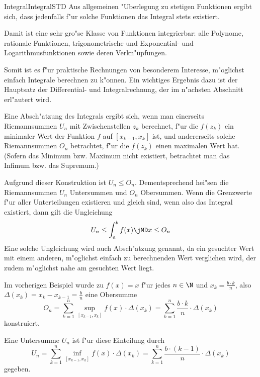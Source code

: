 \begin{MXContent}{Integral}{Integral}{STD}
Aus allgemeinen "Uberlegung zu stetigen Funktionen ergibt sich, dass jedenfalls 
f"ur solche Funktionen das Integral stets existiert.

Damit ist eine sehr gro"se Klasse von Funktionen integrierbar: alle Polynome,
rationale Funktionen, trigonometrische und Exponential- und Logarithmusfunktionen
sowie deren Verkn"upfungen.

Somit ist es f"ur praktische Rechnungen von besonderem Interesse, m"oglichst 
einfach Integrale berechnen zu k"onnen. Ein wichtiges Ergebnis dazu ist der 
Hauptsatz der Differential- und Integralrechnung, der im n"achsten Abschnitt 
erl"autert wird.

Eine Absch"atzung des Integrals ergibt sich, wenn man einerseits Riemannsummen 
$U_n$ mit {\glqq}Zwischenstellen{\grqq} $z_k$ berechnet, f"ur die $f(z_k)$ ein
minimaler Wert der Funktion $f$ auf $[x_{k-1}, x_k]$ ist, und andererseits 
solche Riemannsummen $O_n$ betrachtet, f"ur die $f(z_k)$ einen maximalen Wert 
hat. (Sofern das Minimum bzw. Maximum nicht existiert, betrachtet man das 
Infimum bzw. das Supremum.)

Aufgrund dieser Konstruktion ist $U_n \leq O_n$. 
Dementsprechend hei"sen die Riemannsummen $U_n$ Untersummen und $O_n$ Obersummen. 
Wenn die Grenzwerte f"ur aller Unterteilungen 
existieren und gleich sind, wenn also das Integral existiert, dann gilt die 
Ungleichung
\begin{equation}
U_n \leq \int_a^b f(x) \jMD x \leq O_n
\end{equation}
Eine solche Ungleichung wird auch Absch"atzung genannt, da ein gesuchter Wert 
mit einem anderen, m"oglichst einfach zu berechnenden Wert verglichen wird, 
der zudem m"oglichst {\glqq}nahe{\grqq} am gesuchten Wert liegt.

\begin{MExample}
Im vorherigen Beispiel wurde zu $f(x) = x$ f"ur jedes $n \in \N$ und 
$x_k = \frac{b \cdot k}{n}$, also 
$\Delta(x_k) = x_k - x_{k-1} = \frac{b}{n}$ 
eine Obersumme
\[
O_n = \sum_{k=1}^n \sup_{[x_{k-1}, x_k]} f(x) \cdot \Delta(x_k) %
 = \sum_{k=1}^n \frac{b \cdot k}{n} \cdot \Delta(x_k) %
\]
konstruiert.

Eine Untersumme $U_n$ ist f"ur diese Einteilung durch
\[
U_n = \sum_{k=1}^n \inf_{[x_{k-1}, x_k]} f(x) \cdot \Delta(x_k) %
 = \sum_{k=1}^n \frac{b \cdot (k-1)}{n} \cdot \Delta(x_k) %
\]
gegeben.
\end{MExample}

\end{MXContent}


